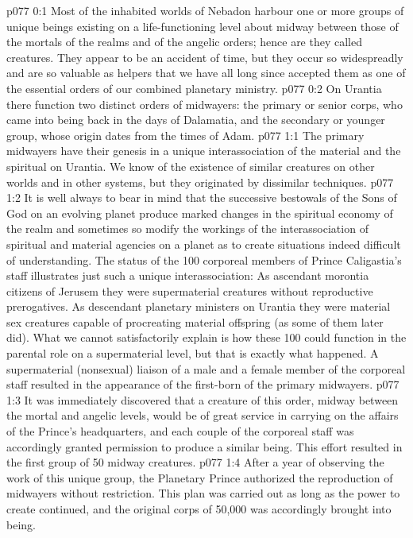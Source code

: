\author{Archangel}
\vs p077 0:1 Most of the inhabited worlds of Nebadon harbour one or more groups of unique beings existing on a life\hyp{}functioning level about midway between those of the mortals of the realms and of the angelic orders; hence are they called  creatures. They appear to be an accident of time, but they occur so widespreadly and are so valuable as helpers that we have all long since accepted them as one of the essential orders of our combined planetary ministry.
\vs p077 0:2 On Urantia there function two distinct orders of midwayers: the primary or senior corps, who came into being back in the days of Dalamatia, and the secondary or younger group, whose origin dates from the times of Adam.
\vs p077 1:1 The primary midwayers have their genesis in a unique interassociation of the material and the spiritual on Urantia. We know of the existence of similar creatures on other worlds and in other systems, but they originated by dissimilar techniques.
\vs p077 1:2 It is well always to bear in mind that the successive bestowals of the Sons of God on an evolving planet produce marked changes in the spiritual economy of the realm and sometimes so modify the workings of the interassociation of spiritual and material agencies on a planet as to create situations indeed difficult of understanding. The status of the 100 corporeal members of Prince Caligastia’s staff illustrates just such a unique interassociation: As ascendant morontia citizens of Jerusem they were supermaterial creatures without reproductive prerogatives. As descendant planetary ministers on Urantia they were material sex creatures capable of procreating material offspring (as some of them later did). What we cannot satisfactorily explain is how these 100 could function in the parental role on a supermaterial level, but that is exactly what happened. A supermaterial (nonsexual) liaison of a male and a female member of the corporeal staff resulted in the appearance of the first\hyp{}born of the primary midwayers.
\vs p077 1:3 It was immediately discovered that a creature of this order, midway between the mortal and angelic levels, would be of great service in carrying on the affairs of the Prince’s headquarters, and each couple of the corporeal staff was accordingly granted permission to produce a similar being. This effort resulted in the first group of 50 midway creatures.
\vs p077 1:4 After a year of observing the work of this unique group, the Planetary Prince authorized the reproduction of midwayers without restriction. This plan was carried out as long as the power to create continued, and the original corps of 50,000 was accordingly brought into being.
